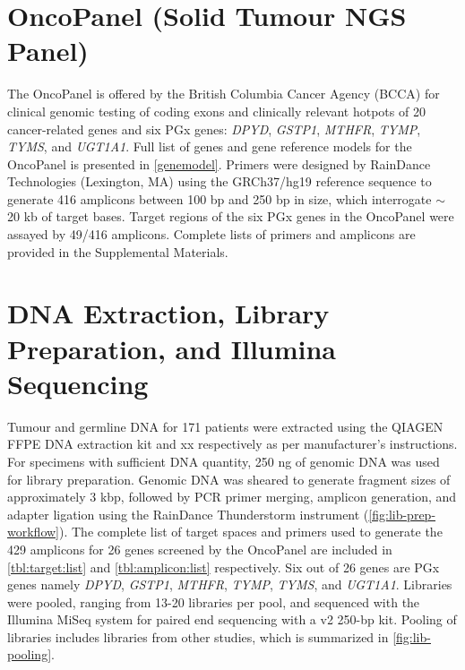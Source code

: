 \section{OncoPanel (Solid Tumour NGS Panel)}
\label{sec:OncoPanel}

The OncoPanel is offered by the British Columbia Cancer Agency (BCCA) for clinical genomic testing of coding exons and clinically relevant hotpots of 20 cancer-related genes and six PGx genes: \textit{DPYD}, \textit{GSTP1}, \textit{MTHFR}, \textit{TYMP}, \textit{TYMS}, and \textit{UGT1A1}. Full list of genes and gene reference models for the OncoPanel is presented in \autoref{genemodel}. Primers were designed by RainDance Technologies (Lexington, MA) using the GRCh37/hg19 reference sequence to generate 416 amplicons between 100 bp and 250 bp in size, which interrogate $\sim$ 20 kb of target bases. Target regions of the six PGx genes in the OncoPanel were assayed by 49/416 amplicons. Complete lists of primers and amplicons are provided in the Supplemental Materials.

\section{DNA Extraction, Library Preparation, and Illumina Sequencing}
\label{sec:DNAExtraction}

Tumour and germline DNA for 171 patients were extracted using the QIAGEN FFPE DNA extraction kit and xx respectively as per manufacturer's instructions. For specimens with sufficient DNA quantity, 250 ng of genomic DNA was used for library preparation. Genomic DNA was sheared to generate fragment sizes of approximately 3 kbp, followed by PCR primer merging, amplicon generation, and adapter ligation using the RainDance Thunderstorm instrument (\autoref{fig:lib-prep-workflow}). The complete list of target spaces and primers used to generate the 429 amplicons for 26 genes screened by the OncoPanel are included in \autoref{tbl:target:list} and \autoref{tbl:amplicon:list} respectively. Six out of 26 genes are PGx genes namely \textit{DPYD}, \textit{GSTP1}, \textit{MTHFR}, \textit{TYMP}, \textit{TYMS}, and \textit{UGT1A1}. Libraries were pooled, ranging from 13-20 libraries per pool, and sequenced with the Illumina MiSeq system for paired end sequencing with a v2 250-bp kit. Pooling of libraries includes libraries from other studies, which is summarized in \autoref{fig:lib-pooling}.

